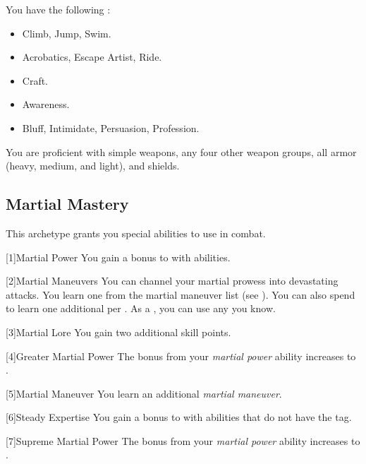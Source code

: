         You have the following :
        \begin{itemize}
            \item {} Climb, Jump, Swim.
            \item {} Acrobatics, Escape Artist, Ride.
            \item {} Craft.
            \item {} Awareness.
            \item {} Bluff, Intimidate, Persuasion, Profession.
        \end{itemize}

        You are proficient with simple weapons, any four other weapon groups, all armor (heavy, medium, and light), and shields.

    \subsection{Martial Mastery}
        This archetype grants you special abilities to use in combat.

        [1]{Martial Power} You gain a  bonus to  with  abilities.

        [2]{Martial Maneuvers}
        You can channel your martial prowess into devastating attacks.
        You learn one  from the martial maneuver list (see ).
        You can also spend  to learn one additional  per .
        As a , you can use any  you know.

        [3]{Martial Lore} You gain two additional skill points.

        [4]{Greater Martial Power} The bonus from your \textit{martial power} ability increases to .

        [5]{Martial Maneuver}
        You learn an additional \textit{martial maneuver}.

        [6]{Steady Expertise} You gain a  bonus to  with  abilities that do not have the  tag.

        [7]{Supreme Martial Power} The bonus from your \textit{martial power} ability increases to .

